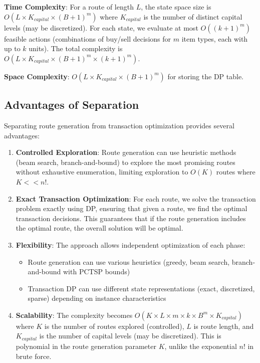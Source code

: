 \documentclass[12pt]{article}
\begin{document}
\textbf{Time Complexity}: For a route of length $L$, the state space size is $O(L \times K_{capital} \times (B+1)^m)$ where $K_{capital}$ is the number of distinct capital levels (may be discretized). For each state, we evaluate at most $O((k+1)^m)$ feasible actions (combinations of buy/sell decisions for $m$ item types, each with up to $k$ units). The total complexity is $O(L \times K_{capital} \times (B+1)^m \times (k+1)^m)$.

\textbf{Space Complexity}: $O(L \times K_{capital} \times (B+1)^m)$ for storing the DP table.

\subsection{Advantages of Separation}

Separating route generation from transaction optimization provides several advantages:

\begin{enumerate}
    \item \textbf{Controlled Exploration}: Route generation can use heuristic methods (beam search, branch-and-bound) to explore the most promising routes without exhaustive enumeration, limiting exploration to $O(K)$ routes where $K << n!$.
    
    \item \textbf{Exact Transaction Optimization}: For each route, we solve the transaction problem exactly using DP, ensuring that given a route, we find the optimal transaction decisions. This guarantees that if the route generation includes the optimal route, the overall solution will be optimal.
    
    \item \textbf{Flexibility}: The approach allows independent optimization of each phase:
    \begin{itemize}
        \item Route generation can use various heuristics (greedy, beam search, branch-and-bound with PCTSP bounds)
        \item Transaction DP can use different state representations (exact, discretized, sparse) depending on instance characteristics
    \end{itemize}
    
    \item \textbf{Scalability}: The complexity becomes $O(K \times L \times m \times k \times B^m \times K_{capital})$ where $K$ is the number of routes explored (controlled), $L$ is route length, and $K_{capital}$ is the number of capital levels (may be discretized). This is polynomial in the route generation parameter $K$, unlike the exponential $n!$ in brute force.
\end{enumerate}
\end{document}
